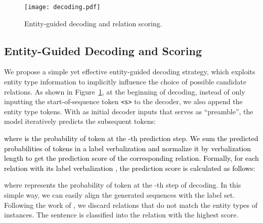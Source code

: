 \documentclass[11pt]{article}
\begin{document}
\begin{comment}
In addition, noting that entity types and relations have explicit knowledge constraints, we introduce structural constraints for the three sentinel tokens in the template to inject implicit correlations between entity types and relationships, as they are served as type tokens of head and tail entities and label verbalizations. To this end, we minimize a margin-based ranking criterion following the formula in \citet{DBLP:conf/nips/BordesUGWY13}.

where  is the -norm, , , and  are embeddings of sentinel tokens \texttt{[X]}, \texttt{[Y]}, and \texttt{[Z]},   denotes the positive part,  is a margin hyperparameter, and  are negative samples. 

The overall optimization objective is , where  is a hyperparameter to balance the two terms.
\end{comment}

\begin{figure}[t!]
\flushleft
\texttt{[image: decoding.pdf]}
\caption{Entity-guided decoding and relation scoring.}
\label{decoding} 
\end{figure}
\subsection{Entity-Guided Decoding  and Scoring}\label{4.4}

We propose a simple yet effective entity-guided decoding strategy, which exploits entity type information to implicitly influence the choice of possible candidate relations. As shown in Figure~\ref{decoding}, at the beginning of decoding, instead of only inputting the start-of-sequence token \texttt{<s>} to the decoder, we also append the entity type tokens. 
With  as initial decoder inputs that serves as ``preamble'', the model iteratively predicts the subsequent tokens:

{\textcolor{black}{where  is the probability of token  at the -th prediction step.
We sum the predicted probabilities of tokens in a label verbalization and normalize it by verbalization length to get the prediction score of the corresponding relation.
Formally, for each relation  with its label verbalization , the prediction score  is calculated as follows:}}

where  represents the probability of token  at the -th step of decoding. In this simple way, we can easily align the generated sequences with the label set.
Following the work of \citet{DBLP:conf/emnlp/SainzLLBA21}, we discard relations that do not match the entity types of instances. The sentence is classified into the relation with the highest score.  
\end{document}
